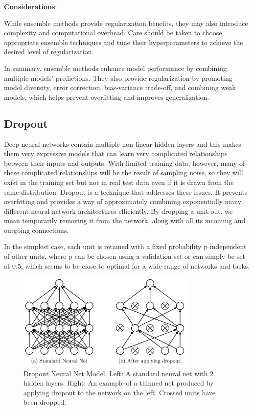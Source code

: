 \documentclass{report}
\begin{document}
\textbf{Considerations}:

While ensemble methods provide regularization benefits, they may also introduce complexity and computational overhead. Care should be taken to choose appropriate ensemble techniques and tune their hyperparameters to achieve the desired level of regularization.

In summary, ensemble methods enhance model performance by combining multiple models' predictions. They also provide regularization by promoting model diversity, error correction, bias-variance trade-off, and combining weak models, which helps prevent overfitting and improves generalization.


\subsection{Dropout}
Deep neural networks contain multiple non-linear hidden layers and this makes them very expressive models that can learn very complicated relationships between their inputs and outputs. With limited training data, however, many of these complicated relationships will be the result of sampling noise, so they will exist in the training set but not in real test data even if it is drawn from the same distribution. Dropout is a technique that addresses these issues. It prevents overfitting and provides a way of approximately combining exponentially many different neural network architectures efficiently. By dropping a unit out, we mean temporarily removing it from the network, along with all its incoming and outgoing connections. 

In the simplest case, each unit is retained with a fixed probability p independent of other units, where p can be chosen using a validation set or can simply be set at 0.5, which seems to be close to optimal for a wide range of networks and tasks. 

\begin{figure}[ht]
	\includegraphics[width=250pt]{16}
	\centering 
	\caption{Dropout Neural Net Model. Left: A standard neural net with 2 hidden layers. Right: An example of a thinned net produced by applying dropout to the network on the left. Crossed units have been dropped.}
\end{figure}
\end{document}
